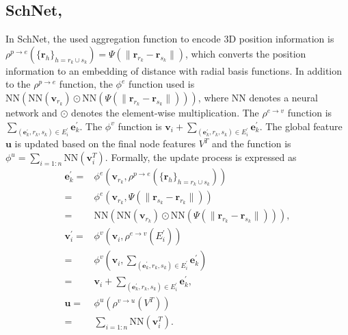 \documentclass{article}
\begin{document}
\subsection[SchNet,]{SchNet, \cite{schutt2017schnet}}
In SchNet, the used aggregation function to encode 3D position information is  $\rho^{p\rightarrow e}\left(\{\mathbf{r}_h\}_{h=r_k \cup s_k}\right)=\Psi\left(\|\mathbf{r}_{r_k}-\mathbf{r}_{s_k} \|\right)$, which converts the position information to an embedding of distance with radial basis functions. In addition to the $\rho^{p\rightarrow e}$ function, the $\phi^e$ function used is $\text{NN}\left(\text{NN}\left(\mathbf{v}_{r_k}\right)\odot \text{NN}\left(\Psi\left(\|\mathbf{r}_{r_k}-\mathbf{r}_{s_k} \|\right)\right)\right)$, where $\text{NN}$ denotes a neural network and $\odot$ denotes the element-wise multiplication. The $\rho^{e\rightarrow v}$ function is $\sum_{\left(\mathbf{e}^\prime_k, r_k, s_k\right)\in E_{i}^\prime}\mathbf{e}^\prime_k$. The $\phi^v$ function is $\mathbf{v}_i+\sum_{\left(\mathbf{e}^\prime_k, r_k, s_k\right)\in E_{i}^\prime}\mathbf{e}^\prime_k$. The global feature $\mathbf{u}$ is updated based on the final node features $V^T$ and the function is $\phi^u=\sum_{i=1:n}\text{NN}\left(\mathbf{v}^T_i\right)$.
Formally, the update process is expressed as
\begin{equation}\label{eq:schnet}
\begin{aligned}
\mathbf{e}^\prime_k 
=& \phi^e\left( \mathbf{v}_{r_k}, \rho^{p\rightarrow e}\left(\{\mathbf{r}_h\}_{h=r_k \cup s_k}\right)\right)\\
=& \phi^e\left( \mathbf{v}_{r_k}, \Psi\left(\|\mathbf{r}_{s_k}-\mathbf{r}_{r_k} \|\right)\right)\\
=&\text{NN}\left(\text{NN}\left(\mathbf{v}_{r_k}\right)\odot \text{NN}\left(\Psi\left(\|\mathbf{r}_{r_k}-\mathbf{r}_{s_k} \|\right)\right)\right),\\
\mathbf{v}^\prime_i 
=&\phi^v\left(\mathbf{v}_i, \rho^{e\rightarrow v}\left(E_{i}^\prime\right)\right)\\
=&\phi^v\left(\mathbf{v}_i, \sum_{\left(\mathbf{e}^\prime_k, r_k, s_k\right)\in E_{i}^\prime}\mathbf{e}^\prime_k\right)\\
=&\mathbf{v}_i+\sum_{\left(\mathbf{e}^\prime_k, r_k, s_k\right)\in E_{i}^\prime}\mathbf{e}^\prime_k,\\
\mathbf{u} 
=&  \phi^u\left(\rho^{v\rightarrow u}\left(V^T\right)\right)\\
=& \sum_{i=1:n}\text{NN}\left(\mathbf{v}^T_i\right).
\end{aligned}
\end{equation}
\end{document}
